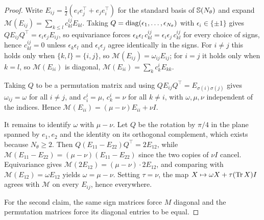 \begin{proof}
    Write $E_{ij} = \frac{1}{2}(e_i e_j^\top + e_j e_i^\top)$ for the standard basis of $\mathbb{S}(N_\theta)$ and expand $\mathcal{M}(E_{ij}) = \sum_{k \leq l} c^{ij}_{kl} E_{kl}$. Taking $Q = \operatorname{diag}(\epsilon_1, \ldots, \epsilon_{N_\theta})$ with $\epsilon_i \in \{\pm 1\}$ gives $Q E_{ij} Q^\top = \epsilon_i \epsilon_j E_{ij}$, so equivariance forces $\epsilon_k \epsilon_l \, c^{ij}_{kl} = \epsilon_i \epsilon_j \, c^{ij}_{kl}$ for every choice of signs, hence $c^{ij}_{kl} = 0$ unless $\epsilon_k\epsilon_l$ and $\epsilon_i\epsilon_j$ agree identically in the signs. For $i \neq j$ this holds only when $\{k,l\} = \{i,j\}$, so $\mathcal{M}(E_{ij}) = \omega_{ij} E_{ij}$; for $i = j$ it holds only when $k = l$, so $\mathcal{M}(E_{ii})$ is diagonal, $\mathcal{M}(E_{ii}) = \sum_k c^i_k E_{kk}$.

    Taking $Q$ to be a permutation matrix and using $Q E_{ij} Q^\top = E_{\sigma(i)\sigma(j)}$ gives $\omega_{ij} = \omega$ for all $i \neq j$, and $c^i_i = \mu$, $c^i_k = \nu$ for all $k \neq i$, with $\omega, \mu, \nu$ independent of the indices. Hence $\mathcal{M}(E_{ii}) = (\mu - \nu) E_{ii} + \nu I$.

    It remains to identify $\omega$ with $\mu - \nu$. Let $Q$ be the rotation by $\pi/4$ in the plane spanned by $e_1, e_2$ and the identity on its orthogonal complement, which exists because $N_\theta \geq 2$. Then $Q (E_{11} - E_{22}) Q^\top = 2 E_{12}$, while $\mathcal{M}(E_{11} - E_{22}) = (\mu - \nu)(E_{11} - E_{22})$ since the two copies of $\nu I$ cancel. Equivariance gives $\mathcal{M}(2E_{12}) = (\mu - \nu) \cdot 2 E_{12}$, and comparing with $\mathcal{M}(E_{12}) = \omega E_{12}$ yields $\omega = \mu - \nu$. Setting $\tau = \nu$, the map $X \mapsto \omega X + \tau (\operatorname{Tr} X) I$ agrees with $\mathcal{M}$ on every $E_{ij}$, hence everywhere.

    For the second claim, the same sign matrices force $M$ diagonal and the permutation matrices force its diagonal entries to be equal.
\end{proof}

